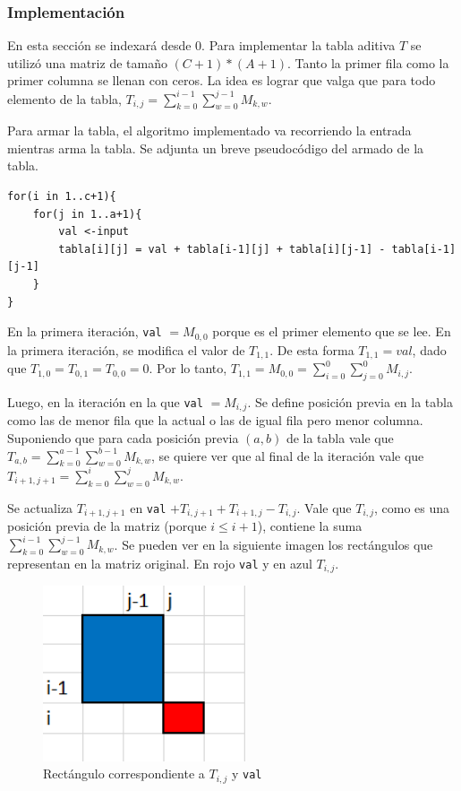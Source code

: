 \subsubsection{Implementación}

En esta sección se indexará desde 0. Para implementar la tabla aditiva $T$ se utilizó una matriz de tamaño $(C+1)*(A+1)$. Tanto la primer fila como la primer columna se llenan con ceros. La idea es lograr que valga que para todo elemento de la tabla, $T_{i,j} = \sum_{k=0}^{i-1} \sum_{w=0}^{j-1} M_{k,w}$.

Para armar la tabla, el algoritmo implementado va recorriendo la entrada mientras arma la tabla. Se adjunta un breve pseudocódigo del armado de la tabla.

\begin{verbatim}
for(i in 1..c+1){
    for(j in 1..a+1){
        val <-input
        tabla[i][j] = val + tabla[i-1][j] + tabla[i][j-1] - tabla[i-1][j-1]
    }
}    
\end{verbatim}

En la primera iteración, \texttt{val} $= M_{0,0}$ porque es el primer elemento que se lee. En la primera iteración, se modifica el valor de $T_{1,1}$. De esta forma $T_{1,1} = val$, dado que $T_{1,0} = T_{0,1} = T_{0,0} = 0$. Por lo tanto, $T_{1,1} = M_{0,0} = \sum_{i=0}^{0} \sum_{j=0}^{0} M_{i,j}$.

Luego, en la iteración en la que \texttt{val} $= M_{i,j}$. Se define posición previa en la tabla como las de menor fila que la actual o las de igual fila pero menor columna. Suponiendo que para cada posición previa $(a,b)$ de la tabla vale que $T_{a,b} = \sum_{k=0}^{a-1} \sum_{w=0}^{b-1} M_{k,w}$, se quiere ver que al final de la iteración vale que $T_{i+1,j+1} = \sum_{k=0}^{i} \sum_{w=0}^{j} M_{k,w}$. 

Se actualiza $T_{i+1,j+1}$ en \texttt{val} $+ T_{i,j+1} + T_{i+1,j} - T_{i,j}$. Vale que $T_{i,j}$, como es una posición previa de la matriz (porque $i \leq i+1$), contiene la suma $\sum_{k=0}^{i-1} \sum_{w=0}^{j-1} M_{k,w}$. Se pueden ver en la siguiente imagen los rectángulos que representan en la matriz original. En rojo \texttt{val} y en azul $T_{i,j}$.

\begin{figure}[H]
\centering
\includegraphics[width=6cm]{Imagenes/Ej3f.png}
\caption{Rectángulo correspondiente a $T_{i,j}$ y \texttt{val}}
\end{figure}

